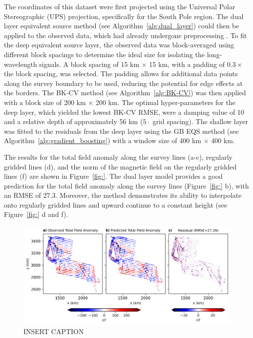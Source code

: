 The coordinates of this dataset were first projected using the Universal Polar Stereographic (UPS) projection, specifically for the South Pole region. The dual layer equivalent source method (see Algorithm~\ref{alg:dual_layer}) could then be applied to the observed data, which had already undergone preprocessing \citep{ICEGRAV_data}. To fit the deep equivalent source layer, the observed data was block-averaged using different block spacings to determine the ideal size for isolating the long-wavelength signals. A block spacing of 15 km $\times$ 15 km, with a padding of $ 0.3 \times $ the block spacing, was selected. The padding allows for additional data points along the survey boundary to be used, reducing the potential for edge effects at the borders. The BK-CV method (see Algorithm~\ref{alg:BK-CV}) was then applied with a block size of 200 km $\times$ 200 km. The optimal hyper-parameters for the deep layer, which yielded  the lowest BK-CV RMSE, were a damping value of 10 and a relative depth of approximately 56 km ($5 \cdot $ grid spacing). The shallow layer was fitted to the residuals from the deep layer using the GB EQS method (see Algorithm~\ref{alg:gradient_boosting}) with a window size of 400 km $\times$ 400 km.

The results for the total field anomaly along the survey lines (a-c), regularly gridded lines (d), and the norm of the magnetic field on the regularly gridded lines (f) are shown in Figure~\ref{fig:}. The dual layer model provides a good prediction for the total field anomaly along the survey lines (Figure~\ref{fig:} b), with an RMSE of 27.3. Moreover, the method demonstrates its ability to interpolate onto regularly gridded lines and upward continue to a constant height (see Figure~\ref{fig:} d and f).

\begin{figure}[!h]
\centering
\includegraphics[width=1\linewidth]{paper/figures/real_line_pred.png}
\caption{
    INSERT CAPTION
}
\label{fig:real_line_pred}
\end{figure}
\

